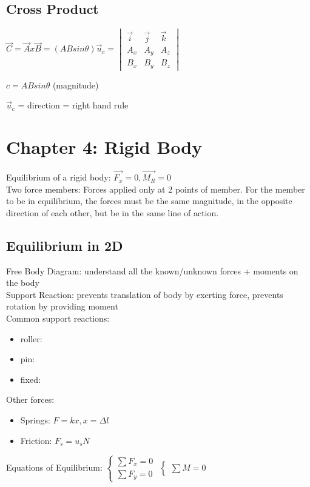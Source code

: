 \documentclass{article}
\begin{document}
    \subsection{Cross Product}
    $\vec{C}=\vec{A}x\vec{B}=(ABsin\theta)\vec{u}_c= 
        \begin{vmatrix}
            \vec{i} & \vec{j} & \vec{k} \\ A_x & A_y & A_z \\ B_x & B_y & B_z
        \end{vmatrix}$

    $c=ABsin\theta$ (magnitude)
    
    $\vec{u}_c$ = direction = right hand rule 

    \newpage

    \section{Chapter 4: Rigid Body}
    Equilibrium of a rigid body: $\vec{F_x}=0, \vec{M_R}=0$\\
    Two force members: Forces applied only at 2 points of member. For the member to be in equilibrium, the forces must be the same magnitude, 
    in the opposite direction of each other, but be in the same line of action.

    \subsection{Equilibrium in 2D}
    Free Body Diagram: understand all the known/unknown forces + moments on the body \\
    Support Reaction: prevents translation of body by exerting force, prevents rotation by providing moment\\
    Common support reactions:
    \begin{itemize}
        \item roller:
        \item pin:
        \item fixed:
    \end{itemize}
    Other forces:
    \begin{itemize}
        \item Springs: $F=kx, x=\Delta l$ 
        \item Friction: $F_s=u_sN$
    \end{itemize}
    Equations of Equilibrium:
    $\begin{cases}
        \sum F_x = 0 \\ \sum F_y = 0 
    \end{cases}$
    $\begin{cases}
        \sum M = 0 
    \end{cases}$
\end{document}
